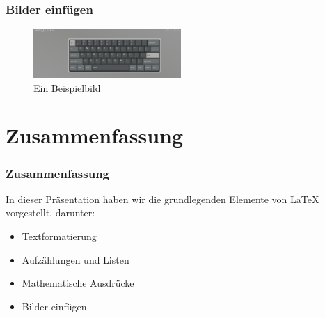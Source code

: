 \documentclass{beamer}
\begin{document}
\begin{frame}
    \frametitle{Bilder einfügen}
    \begin{figure}
        \centering
        \includegraphics[width=0.5\textwidth]{sample}
        \caption{Ein Beispielbild}
    \end{figure}
\end{frame}

\section{Zusammenfassung}

\begin{frame}
    \frametitle{Zusammenfassung}
    In dieser Präsentation haben wir die grundlegenden Elemente von LaTeX vorgestellt, darunter:
    \begin{itemize}
        \item Textformatierung
        \item Aufzählungen und Listen
        \item Mathematische Ausdrücke
        \item Bilder einfügen
    \end{itemize}
\end{frame}
\end{document}
